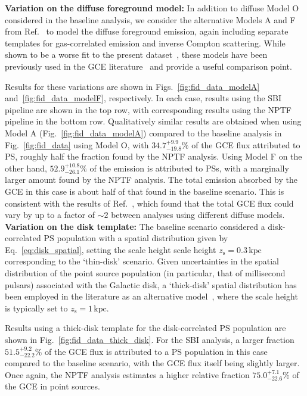 \documentclass[prd,aps,10pt,nofootinbib,twocolumn,superscriptaddress,preprintnumbers,balancelastpage,longbibliography]{revtex4-1}
\begin{document}
\noindent
\textbf{Variation on the diffuse foreground model:}
In addition to diffuse Model O considered in the baseline analysis, we consider the alternative Models A and F from Ref.~\cite{Calore:2014xka} to model the diffuse foreground emission, again including separate templates for gas-correlated emission and inverse Compton scattering. While shown to be a worse fit to the present dataset~\cite{Buschmann:2020adf}, these models have been previously used in the GCE literature~\cite{Buschmann:2020adf,Leane:2020pfc,Leane:2020nmi} and provide a useful comparison point.

Results for these variations are shown in Figs.~\ref{fig:fid_data_modelA} and~\ref{fig:fid_data_modelF}, respectively. In each case, results using the SBI pipeline are shown in the top row, with corresponding results using the NPTF pipeline in the bottom row. 
Qualitatively similar results are obtained when using Model A (Fig.~\ref{fig:fid_data_modelA}) compared to the baseline analysis in Fig.~\ref{fig:fid_data} using Model O, with $34.7^{+9.9}_{-19.8}\%$ of the GCE flux attributed to PS, roughly half the fraction found by the NPTF analysis. Using Model F on the other hand, $52.9^{+10.8}_{-26.1}\%$ of the emission is attributed to PSs, with a marginally larger amount found by the NPTF analysis. The total emission absorbed by the GCE in this case is about half of that found in the baseline scenario. This is consistent with the results of Ref.~\cite{Buschmann:2020adf}, which found that the total GCE flux could vary by up to a factor of $\sim 2$ between analyses using different diffuse models. \\

\noindent
\textbf{Variation on the disk template:}
The baseline scenario considered a disk-correlated PS population with a spatial distribution given by Eq.~\eqref{eq:disk_spatial}, setting the scale height scale height $z_\mathrm{s} = 0.3\,\mathrm{kpc}$ corresponding to the `thin-disk' scenario. Given uncertainties in the spatial distribution of the point source population (in particular, that of millisecond pulsars) associated with the Galactic disk, a `thick-disk' spatial distribution has been employed in the literature as an alternative model~\cite{Lee:2015fea,Leane:2019xiy,Buschmann:2020adf}, where the scale height is typically set to $z_\mathrm{s} = 1\,\mathrm{kpc}$. 

Results using a thick-disk template for the disk-correlated PS population are shown in Fig.~\ref{fig:fid_data_thick_disk}. For the SBI analysis, a larger fraction $51.5^{+9.2}_{-22.2}\%$ of the GCE flux is attributed to a PS population in this case compared to the baseline scenario, with the GCE flux itself being slightly larger. Once again, the NPTF analysis estimates a higher relative fraction $75.0^{+7.1}_{-22.6}\%$ of the GCE in point sources.\\
\end{document}
